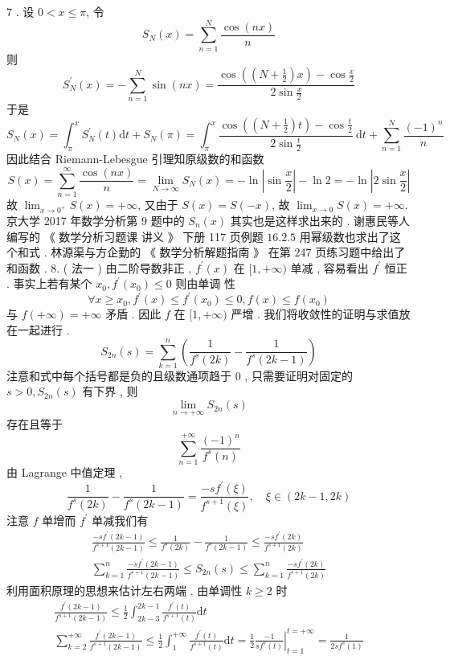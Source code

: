\documentclass[10pt]{article}
\begin{document}
7 .  设  $0<x \leqslant \pi$,  令 
$$
S_{N}(x)=\sum_{n=1}^{N} \frac{\cos (n x)}{n}
$$
 则 
$$
S_{N}^{\prime}(x)=-\sum_{n=1}^{N} \sin (n x)=\frac{\cos \left(\left(N+\frac{1}{2}\right) x\right)-\cos \frac{x}{2}}{2 \sin \frac{x}{2}}
$$
 于是 
$$
S_{N}(x)=\int_{\pi}^{x} S_{N}^{\prime}(t) \mathrm{d} t+S_{N}(\pi)=\int_{\pi}^{x} \frac{\cos \left(\left(N+\frac{1}{2}\right) t\right)-\cos \frac{t}{2}}{2 \sin \frac{t}{2}} \mathrm{~d} t+\sum_{n=1}^{N} \frac{(-1)^{n}}{n}
$$
 因此结合  Riemann-Lebesgue  引理知原级数的和函数 
$$
S(x)=\sum_{n=1}^{\infty} \frac{\cos (n x)}{n}=\lim _{N \rightarrow \infty} S_{N}(x)=-\ln \left|\sin \frac{x}{2}\right|-\ln 2=-\ln \left|2 \sin \frac{x}{2}\right|
$$
 故  $\lim _{x \rightarrow 0^{+}} S(x)=+\infty$,  又由于  $S(x)=S(-x)$,  故  $\lim _{x \rightarrow 0} S(x)=+\infty$.  京大学  2017  年数学分析第  9  题中的  $S_{n}(x)$  其实也是这样求出来的 .  谢惠民等人编写的 《 数学分析习题课   讲义 》 下册  117  页例题  $16.2 .5$  用幂级数也求出了这个和式 .  林源渠与方企勤的 《 数学分析解题指南 》 在第  247  页练习题中给出了和函数 . 8. ( 法一 )  由二阶导数非正 , $f^{\prime}(x)$  在  $[1,+\infty)$  单减 ,  容易看出  $f^{\prime}$  恒正 .  事实上若有某个  $x_{0}, f^{\prime}\left(x_{0}\right) \leqslant 0$  则由单调   性 
$$
\forall x \geqslant x_{0}, f^{\prime}(x) \leqslant f^{\prime}\left(x_{0}\right) \leqslant 0, f(x) \leqslant f\left(x_{0}\right)
$$
 与  $f(+\infty)=+\infty$  矛盾 .  因此  $f$  在  $[1,+\infty)$  严增 .  我们将收敛性的证明与求值放在一起进行 .
$$
S_{2 n}(s)=\sum_{k=1}^{n}\left(\frac{1}{f^{s}(2 k)}-\frac{1}{f^{s}(2 k-1)}\right)
$$
 注意和式中每个括号都是负的且级数通项趋于  0 ,  只需要证明对固定的  $s>0, S_{2 n}(s)$  有下界 ,  则 
$$
\lim _{n \rightarrow+\infty} S_{2 n}(s)
$$
 存在且等于 
$$
\sum_{n=1}^{+\infty} \frac{(-1)^{n}}{f^{s}(n)}
$$
 由  Lagrange  中值定理 ,
$$
\frac{1}{f^{s}(2 k)}-\frac{1}{f^{s}(2 k-1)}=\frac{-s f^{\prime}(\xi)}{f^{s+1}(\xi)}, \quad \xi \in(2 k-1,2 k)
$$
 注意  $f$  单增而  $f^{\prime}$  单减我们有 
$$
\begin{gathered}
\frac{-s f^{\prime}(2 k-1)}{f^{s+1}(2 k-1)} \leqslant \frac{1}{f^{s}(2 k)}-\frac{1}{f^{s}(2 k-1)} \leqslant \frac{-s f^{\prime}(2 k)}{f^{s+1}(2 k)} \\
\sum_{k=1}^{n} \frac{-s f^{\prime}(2 k-1)}{f^{s+1}(2 k-1)} \leqslant S_{2 n}(s) \leqslant \sum_{k=1}^{n} \frac{-s f^{\prime}(2 k)}{f^{s+1}(2 k)}
\end{gathered}
$$
 利用面积原理的思想来估计左右两端 .  由单调性  $k \geqslant 2$  时 
$$
\begin{gathered}
\frac{f^{\prime}(2 k-1)}{f^{s+1}(2 k-1)} \leqslant \frac{1}{2} \int_{2 k-3}^{2 k-1} \frac{f^{\prime}(t)}{f^{s+1}(t)} \mathrm{d} t \\
\sum_{k=2}^{+\infty} \frac{f^{\prime}(2 k-1)}{f^{s+1}(2 k-1)} \leqslant \frac{1}{2} \int_{1}^{+\infty} \frac{f^{\prime}(t)}{f^{s+1}(t)} \mathrm{d} t=\left.\frac{1}{2} \frac{-1}{s f^{s}(t)}\right|_{t=1} ^{t=+\infty}=\frac{1}{2 s f^{s}(1)}
\end{gathered}
$$
\end{document}
